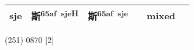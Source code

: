 \documentclass[14pt,a4paper]{scrartcl}
\begin{document}
\begin{longtable}[c]{@{}llllll@{}}
\begin{minipage}[t]{0.14\columnwidth}
sje
\strut\end{minipage} &
\begin{minipage}[t]{0.14\columnwidth}\raggedright\strut
斯\textsuperscript{65af~sjeH}
\strut\end{minipage} &
\begin{minipage}[t]{0.14\columnwidth}\raggedright\strut
斯\textsuperscript{65af~sje}
\strut\end{minipage} &
\begin{minipage}[t]{0.14\columnwidth}\raggedright\strut
\strut\end{minipage} &
\begin{minipage}[t]{0.14\columnwidth}\raggedright\strut
mixed
\strut\end{minipage}\tabularnewline
\bottomrule
\end{longtable}

(251) 0870 {[}2{]}
\end{document}
